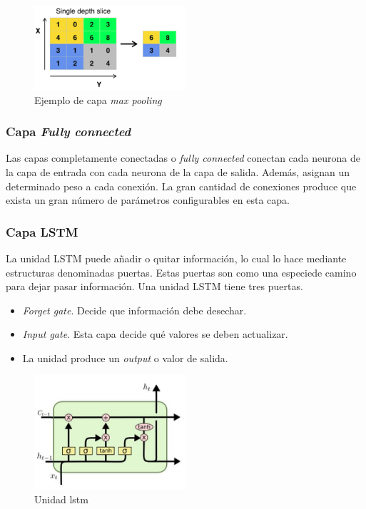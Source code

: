 \begin{figure}[H]
  \begin{center}
    \includegraphics[width=0.5\textwidth]{figures/Introduccion/pooling.png}
		\caption{Ejemplo de capa \textit{max pooling}}
		\label{fig.pooling}
		\end{center}
\end{figure}


\subsubsection{Capa \textit{Fully connected}}

Las capas completamente conectadas o \textit{fully connected} conectan cada neurona de la capa de entrada con cada neurona de la capa de salida. Además, asignan un determinado peso a cada conexión. La gran cantidad de conexiones produce que exista un gran número de parámetros configurables en esta capa.


\subsubsection{Capa LSTM}

La unidad LSTM puede añadir o quitar información, lo cual lo hace mediante estructuras denominadas puertas. Estas puertas son como una especiede camino para dejar pasar información. Una unidad LSTM tiene tres puertas.

\begin{itemize}
    \item \textit{Forget gate}. Decide que información debe desechar. 
    \item \textit{Input gate}. Esta capa decide qué valores se deben actualizar.
    \item La unidad produce un \textit{output} o valor de salida.
\end{itemize}

\begin{figure}[H]
  \begin{center}
    \includegraphics[width=0.5\textwidth]{figures/Introduccion/unidad_lstm.png}
		\caption{Unidad \acrshort{lstm}}
		\label{fig.unidad_lstm}
		\end{center}
\end{figure}
